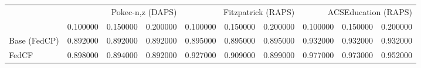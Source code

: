 \begin{tabular}{lrrrrrrrrr}
\toprule
 & \multicolumn{3}{r}{Pokec-{n,z} (DAPS)} & \multicolumn{3}{r}{Fitzpatrick (RAPS)} & \multicolumn{3}{r}{ACSEducation (RAPS)} \\
 & 0.100000 & 0.150000 & 0.200000 & 0.100000 & 0.150000 & 0.200000 & 0.100000 & 0.150000 & 0.200000 \\
\midrule
Base (FedCP) & 0.892000 & 0.892000 & 0.892000 & 0.895000 & 0.895000 & 0.895000 & 0.932000 & 0.932000 & 0.932000 \\
FedCF & 0.898000 & 0.894000 & 0.892000 & 0.927000 & 0.909000 & 0.899000 & 0.977000 & 0.973000 & 0.952000 \\
\bottomrule
\end{tabular}

